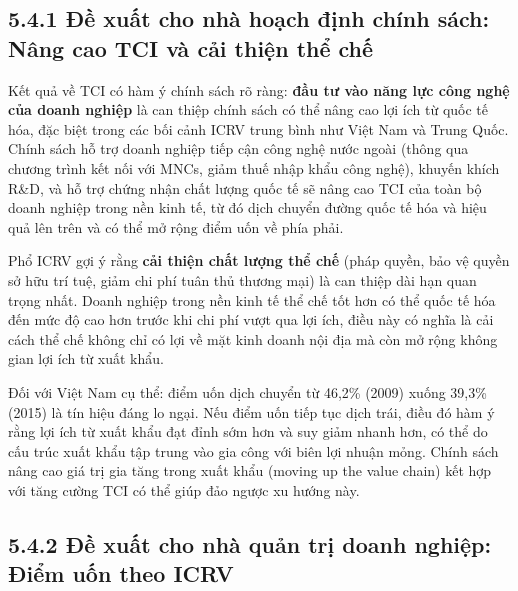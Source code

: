 \documentclass[
  a4paper,
  13pt]{extreport}
\begin{document}
\hypertarget{ux111ux1ec1-xuux1ea5t-cho-nhuxe0-houx1ea1ch-ux111ux1ecbnh-chuxednh-suxe1ch-nuxe2ng-cao-tci-vuxe0-cux1ea3i-thiux1ec7n-thux1ec3-chux1ebf}{%
\subsection{5.4.1 Đề xuất cho nhà hoạch định chính sách: Nâng cao TCI và
cải thiện thể
chế}\label{ux111ux1ec1-xuux1ea5t-cho-nhuxe0-houx1ea1ch-ux111ux1ecbnh-chuxednh-suxe1ch-nuxe2ng-cao-tci-vuxe0-cux1ea3i-thiux1ec7n-thux1ec3-chux1ebf}}

Kết quả về TCI có hàm ý chính sách rõ ràng: \textbf{đầu tư vào năng lực
công nghệ của doanh nghiệp} là can thiệp chính sách có thể nâng cao lợi
ích từ quốc tế hóa, đặc biệt trong các bối cảnh ICRV trung bình như Việt
Nam và Trung Quốc. Chính sách hỗ trợ doanh nghiệp tiếp cận công nghệ
nước ngoài (thông qua chương trình kết nối với MNCs, giảm thuế nhập khẩu
công nghệ), khuyến khích R\&D, và hỗ trợ chứng nhận chất lượng quốc tế
sẽ nâng cao TCI của toàn bộ doanh nghiệp trong nền kinh tế, từ đó dịch
chuyển đường quốc tế hóa và hiệu quả lên trên và có thể mở rộng điểm uốn
về phía phải.

Phổ ICRV gợi ý rằng \textbf{cải thiện chất lượng thể chế} (pháp quyền,
bảo vệ quyền sở hữu trí tuệ, giảm chi phí tuân thủ thương mại) là can
thiệp dài hạn quan trọng nhất. Doanh nghiệp trong nền kinh tế thể chế
tốt hơn có thể quốc tế hóa đến mức độ cao hơn trước khi chi phí vượt qua
lợi ích, điều này có nghĩa là cải cách thể chế không chỉ có lợi về mặt
kinh doanh nội địa mà còn mở rộng không gian lợi ích từ xuất khẩu.

Đối với Việt Nam cụ thể: điểm uốn dịch chuyển từ 46,2\% (2009) xuống
39,3\% (2015) là tín hiệu đáng lo ngại. Nếu điểm uốn tiếp tục dịch trái,
điều đó hàm ý rằng lợi ích từ xuất khẩu đạt đỉnh sớm hơn và suy giảm
nhanh hơn, có thể do cấu trúc xuất khẩu tập trung vào gia công với biên
lợi nhuận mỏng. Chính sách nâng cao giá trị gia tăng trong xuất khẩu
(moving up the value chain) kết hợp với tăng cường TCI có thể giúp đảo
ngược xu hướng này.

\hypertarget{ux111ux1ec1-xuux1ea5t-cho-nhuxe0-quux1ea3n-trux1ecb-doanh-nghiux1ec7p-ux111iux1ec3m-uux1ed1n-theo-icrv}{%
\subsection{5.4.2 Đề xuất cho nhà quản trị doanh nghiệp: Điểm uốn theo
ICRV}\label{ux111ux1ec1-xuux1ea5t-cho-nhuxe0-quux1ea3n-trux1ecb-doanh-nghiux1ec7p-ux111iux1ec3m-uux1ed1n-theo-icrv}}
\end{document}
